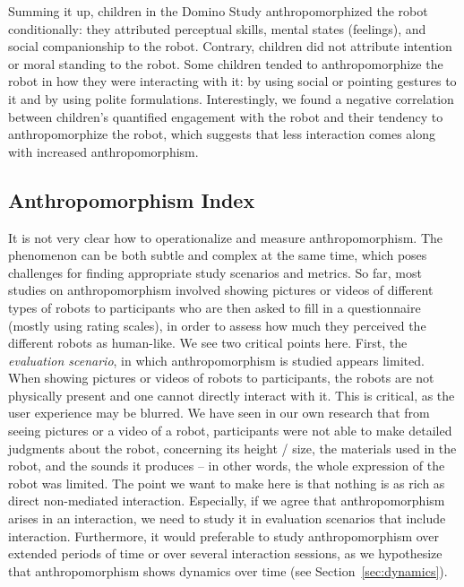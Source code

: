 \documentclass{frontiersSCNS} %
\begin{document}
Summing it up, children in the Domino Study anthropomorphized the robot conditionally: they attributed perceptual skills, mental states (feelings), and social companionship to the robot. Contrary, children did not attribute intention or moral standing to the robot. Some children tended to anthropomorphize the robot in how they were interacting with it: by using social or pointing gestures to it and by using polite formulations. Interestingly, we found a negative correlation between children's quantified engagement with the robot and their tendency to anthropomorphize the robot, which suggests that less interaction comes along with increased anthropomorphism.

%
%
%
%
%
%

\subsection{Anthropomorphism Index}
\label{sec:anthropomorphism-index}

It is not very clear how to operationalize and measure anthropomorphism. The phenomenon can be both subtle and complex at the same time, which poses challenges for finding appropriate study scenarios and metrics. 
So far, most studies on anthropomorphism involved showing pictures or videos of different types of robots to participants who are then asked to fill in a questionnaire (mostly using rating scales), in order to assess how much they perceived the different robots as human-like. We see two critical points here.
First, the \textit{evaluation scenario}, in which anthropomorphism is studied appears limited. When showing pictures or videos of robots to participants, the robots are not physically present and one cannot directly interact with it. This is critical, as the user experience may be blurred. We have seen in our own research that from seeing pictures or a video of a robot, participants were not able to make detailed judgments about the robot, concerning its height / size, the materials used in the robot, and the sounds it produces -- in other words, the whole expression of the robot was limited. The point we want to make here is that nothing is as rich as direct non-mediated interaction. Especially, if we agree that anthropomorphism arises in an interaction, we need to study it in evaluation scenarios that include interaction. Furthermore, it would preferable to study anthropomorphism over extended periods of time or over several interaction sessions, as we hypothesize that anthropomorphism shows dynamics over time (see Section~\ref{sec:dynamics}). 
\end{document}
